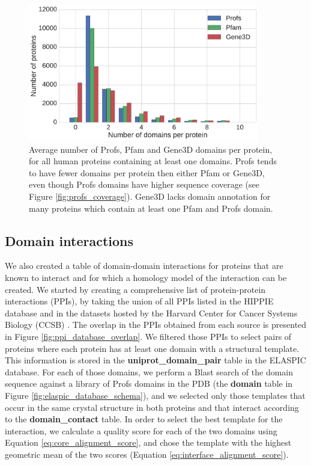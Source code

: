 \begin{figure}[!tb]
	\centering
	\includegraphics[width=0.9\textwidth]{static/profs/domains_per_protein.pdf}
	\caption[Profs, Pfam, and Gene3D domains per protein.]{Average number of Profs, Pfam and Gene3D domains per protein, for all human proteins containing at least one domains. Profs tends to have fewer domains per protein then either Pfam or Gene3D, even though Profs domains have higher sequence coverage (see Figure \ref{fig:profs_coverage}). Gene3D lacks domain annotation for many proteins which contain at least one Pfam and Profs domain.}
	\label{fig:profs_domain_size}
\end{figure}



\subsection{Domain interactions}

We also created a table of domain-domain interactions for proteins that are known to interact and for which a homology model of the interaction can be created. We started by creating a comprehensive list of protein-protein interactions (PPIs), by taking the union of all PPIs listed in the HIPPIE database \cite{schaefer_hippie:_2012} and in the datasets hosted by the Harvard Center for Cancer Systems Biology (CCSB) \cite{rolland_proteome-scale_2014}. The overlap in the PPIs obtained from each source is presented in Figure \ref{fig:ppi_database_overlap}. We filtered those PPIs to select pairs of proteins where each protein has at least one domain with a structural template. This information is stored in the \textbf{uniprot\_domain\_pair} table in the ELASPIC database. For each of those domains, we perform a Blast search of the domain sequence against a library of Profs domains in the PDB (the \textbf{domain} table in Figure \ref{fig:elaspic_database_schema}), and we selected only those templates that occur in the same crystal structure in both proteins and that interact according to the \textbf{domain\_contact} table. In order to select the best template for the interaction, we calculate a quality score for each of the two domains using Equation \ref{eq:core_alignment_score}, and chose the template with the highest geometric mean of the two scores (Equation \ref{eq:interface_alignment_score}).

